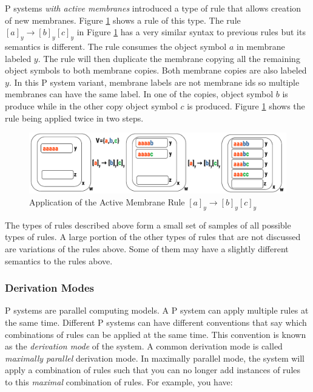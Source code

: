 \documentclass{article}
\begin{document}
P systems \textit{with active membranes} \cite{active-mem} introduced a type of rule that allows
creation of new membranes. Figure \ref{fig:active-mem-rule} shows a rule of this type. The rule 
$[a]_y \rightarrow [b]_y[c]_y$ in Figure \ref{fig:active-mem-rule} has a very similar syntax to 
previous rules but its semantics is different. The rule consumes the object symbol $a$ in membrane 
labeled $y$. The rule will then duplicate the membrane copying all the remaining object symbols to
both membrane copies. Both membrane copies are also labeled $y$. In this P system variant, membrane 
labels are not membrane ids so multiple membranes can have the same label. In one of the copies, 
object symbol $b$ is produce while in the other copy object symbol $c$ is produced. Figure
\ref{fig:active-mem-rule} shows the rule being applied twice in two steps.

\begin{figure}[H]
\begin{center}
\includegraphics[scale=0.55]{figures/zzz-active-mem-rule.pdf}
\caption{Application of the Active Membrane Rule $[a]_y \rightarrow [b]_y[c]_y$}
\label{fig:active-mem-rule}
\end{center}
\end{figure}

The types of rules described above form a small set of samples of all possible types of rules. A 
large portion of the other types of rules that are not discussed are variations of the rules 
above. Some of them may have a slightly different semantics to the rules above.


\subsubsection{Derivation Modes}\label{s-semantics}

P systems are parallel computing models. A P system can apply multiple rules at the same time.
Different P systems can have different conventions that say which combinations of rules can be 
applied at the same time. This convention is known as the \textit{derivation mode} of the system.
A common derivation mode is called \textit{maximally parallel} derivation mode. In maximally
parallel mode, the system will apply a combination of rules such that you can no longer add 
instances of rules to this \textit{maximal} combination of rules. For example, you have:
\end{document}
